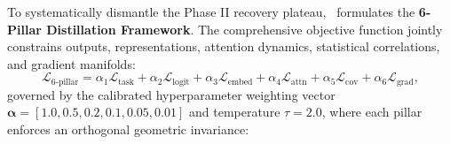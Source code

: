 To systematically dismantle the Phase II recovery plateau, \neuralops\ formulates the \textbf{6-Pillar Distillation Framework}. The comprehensive objective function jointly constrains outputs, representations, attention dynamics, statistical correlations, and gradient manifolds:
\begin{equation}
\label{eq:6pillar_distillation_loss}
\mathcal{L}_{\text{6-pillar}} = \alpha_1 \mathcal{L}_{\text{task}} + \alpha_2 \mathcal{L}_{\text{logit}} + \alpha_3 \mathcal{L}_{\text{embed}} + \alpha_4 \mathcal{L}_{\text{attn}} + \alpha_5 \mathcal{L}_{\text{cov}} + \alpha_6 \mathcal{L}_{\text{grad}},
\end{equation}
governed by the calibrated hyperparameter weighting vector $\bm{\alpha} = [1.0, 0.5, 0.2, 0.1, 0.05, 0.01]$ and temperature $\tau = 2.0$, where each pillar enforces an orthogonal geometric invariance:
